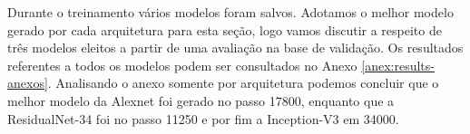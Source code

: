 Durante o treinamento vários modelos foram salvos. Adotamos o melhor modelo gerado por cada arquitetura para esta seção, logo vamos discutir a respeito de três modelos eleitos a partir de uma avaliação na base de validação. Os resultados referentes a todos os modelos podem ser consultados no Anexo \ref{anex:results-anexos}. Analisando o anexo somente por arquitetura podemos concluir que o melhor modelo da Alexnet foi gerado no passo 17800, enquanto que a ResidualNet-34 foi no passo 11250 e por fim a Inception-V3 em 34000.   

